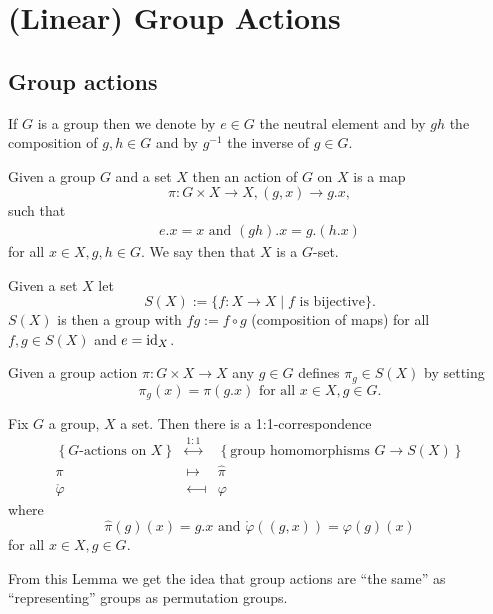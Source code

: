 \chapter{(Linear) Group Actions}


\section{Group actions}


If $G$ is a group then we denote by $e \in G$ the neutral element and by $gh$ the composition of $g,h \in G$ and by $g^{-1}$ the inverse of $g \in G$.


\begin{defi}
 Given a group $G$ and a set $X$ then an action of $G$ on $X$ is a map
 \[
  \pi : G \times X \to X, (g,x) \to g.x,
 \]
 such that
 \begin{gather*}
  e.x = x \text{ and }
  (gh).x = g.(h.x)
 \end{gather*}
 for all $x \in X, g,h \in G$. We say then that $X$ is a $G$-set.
\end{defi}


\begin{defi}
 Given a set $X$ let
 \[
  S(X) := \{f : X \to X \mid f \text{ is bijective}\}.
 \]
 $S(X)$ is then a group with $fg := f \circ g$ (composition of maps) for all $f,g \in S(X)$ and $e = \operatorname{id}_X$.
\end{defi}


Given a group action $\pi : G \times X \to X$ any  $g \in G$ defines $\pi_g \in S(X)$ by setting
\[
 \pi_g(x) = \pi(g.x) \text{ for all } x \in X, g \in G.
\]


\begin{lem}\label{lem: G-actions = group homos G -> S(X)}
 Fix $G$ a group, $X$ a set. Then there is a 1:1-correspondence
 \[
 \begin{matrix}
    \left\{\text{$G$-actions on $X$}\right\}
  & \overset{1:1}{\longleftrightarrow}
  & \left\{\text{group homomorphisms $G \to S(X)$}\right\} \\
    \pi
  & \longmapsto
  & \hat{\pi} \\
    \mathring{\varphi}
  & \longmapsfrom
  & \varphi
  \end{matrix}
 \]
 where
 \[
  \hat{\pi}(g)(x) = g.x \text{ and } \mathring{\varphi}((g,x)) = \varphi(g)(x)
 \]
 for all $x \in X, g \in G$.
\end{lem}


From this Lemma we get the idea that group actions are ``the same'' as ``representing'' groups as permutation groups.


